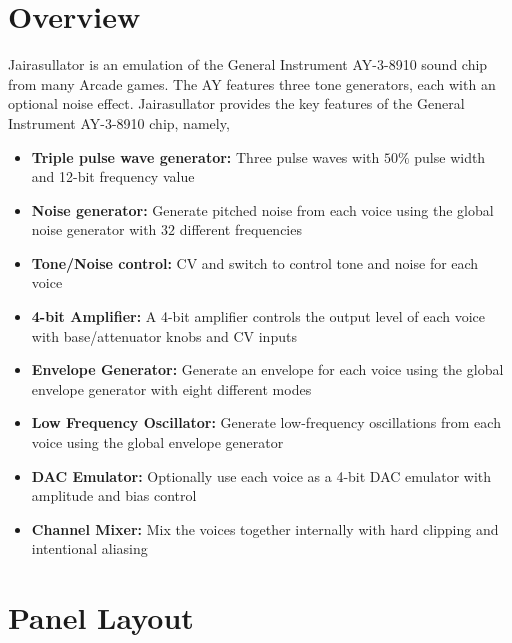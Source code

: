\documentclass[12pt,letter]{article}
\begin{document}


\section{Overview}

Jairasullator is an emulation of the General Instrument AY-3-8910 sound chip from many Arcade games. The AY features three tone generators, each with an optional noise effect. Jairasullator provides the key features of the General Instrument AY-3-8910 chip, namely,
\begin{itemize}
  \item \textbf{Triple pulse wave generator:} Three pulse waves with $50\%$ pulse width and 12-bit frequency value
  \item \textbf{Noise generator:} Generate pitched noise from each voice using the global noise generator with $32$ different frequencies
  \item \textbf{Tone/Noise control:} CV and switch to control tone and noise for each voice
  \item \textbf{4-bit Amplifier:} A 4-bit amplifier controls the output level of each voice with base/attenuator knobs and CV inputs
  \item \textbf{Envelope Generator:} Generate an envelope for each voice using the global envelope generator with eight different modes
  \item \textbf{Low Frequency Oscillator:} Generate low-frequency oscillations from each voice using the global envelope generator
  \item \textbf{DAC Emulator:} Optionally use each voice as a 4-bit DAC emulator with amplitude and bias control
  \item \textbf{Channel Mixer:} Mix the voices together internally with hard clipping and intentional aliasing
\end{itemize}


\clearpage
\section{Panel Layout}
\end{document}
